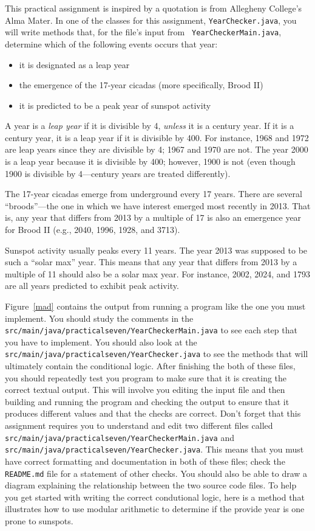 \documentclass[11pt]{article}
\newcommand{\mainprogramsource}{\lstinline{src/main/java/practicalseven/YearCheckerMain.java}}
\newcommand{\secondprogramsource}{\lstinline{src/main/java/practicalseven/YearChecker.java}}
\begin{document}
This practical assignment is inspired by a quotation is from Allegheny College's
Alma Mater. In one of the classes for this assignment, {\tt YearChecker.java},
you will write methods that, for the file's input from {\tt
YearCheckerMain.java}, determine which of the following events occurs that year:
\begin{itemize}

\item it is designated as a leap year

\item the emergence of the 17-year cicadas (more specifically, Brood II)

\item it is predicted to be a peak year of sunspot activity

\end{itemize}

\noindent A year is a {\em leap year\/} if it is divisible by 4, {\em unless\/}
it is a century year. If it is a century year, it is a leap year if it is
divisible by 400. For instance, 1968 and 1972 are leap years since they are
divisible by 4; 1967 and 1970 are not. The year 2000 is a leap year because it
is divisible by 400; however, 1900 is not (even though 1900 is divisible by
4---century years are treated differently).

\noindent The 17-year cicadas emerge from underground every 17 years. There are
several ``broods''---the one in which we have interest emerged most recently in
2013. That is, any year that differs from 2013 by a multiple of 17 is also an
emergence year for Brood II (e.g., 2040, 1996, 1928, and 3713).

\noindent Sunspot activity usually peaks every 11 years. The year 2013 was
supposed to be such a ``solar max'' year. This means that any year that differs
from 2013 by a multiple of 11 should also be a solar max year. For instance,
2002, 2024, and 1793 are all years predicted to exhibit peak activity.

Figure~\ref{mad} contains the output from running a program like the one you
must implement. You should study the comments in the \mainprogramsource{} to see
each step that you have to implement. You should also look at the
\secondprogramsource{} to see the methods that will ultimately contain the
conditional logic. After finishing the both of these files, you should
repeatedly test you program to make sure that it is creating the correct textual
output. This will involve you editing the input file and then building and
running the program and checking the output to ensure that it produces different
values and that the checks are correct. Don't forget that this assignment
requires you to understand and edit two different files called
\mainprogramsource{} and \secondprogramsource{}. This means that you must have
correct formatting and documentation in both of these files; check the {\tt
README.md} file for a statement of other checks. You should also be able to draw
a diagram explaining the relationship between the two source code files. To help
you get started with writing the correct condutional logic, here is a method
that illustrates how to use modular arithmetic to determine if the provide year
is one prone to sunspots.
\end{document}
